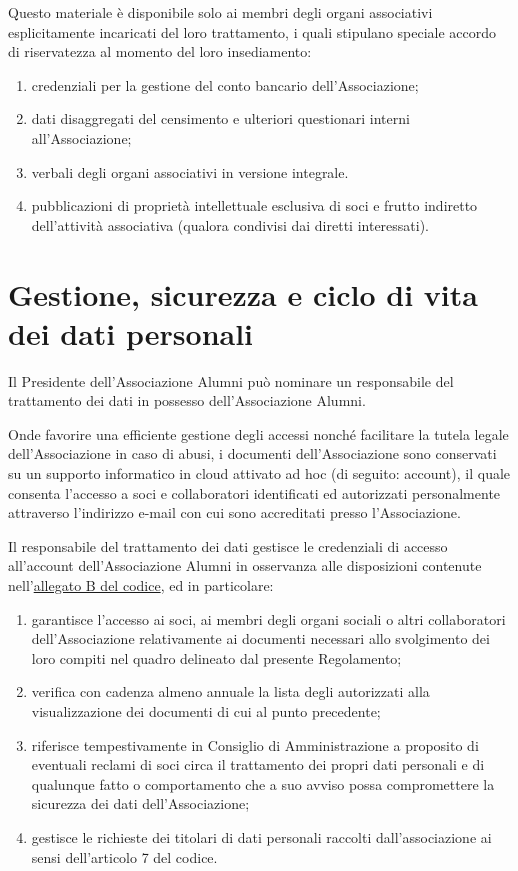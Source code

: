 Questo materiale è disponibile solo ai membri degli organi associativi
esplicitamente incaricati del loro trattamento, i quali stipulano speciale
accordo di riservatezza al momento del loro insediamento:

\begin{enumerate}
    \item credenziali per la gestione del conto bancario dell’Associazione;
    \item dati disaggregati del censimento e ulteriori questionari interni
        all’Associazione;
    \item verbali degli organi associativi in versione integrale.
    \item pubblicazioni di proprietà intellettuale esclusiva di soci e
        frutto indiretto dell’attività associativa (qualora condivisi dai
        diretti interessati).
\end{enumerate}

\section*{Gestione, sicurezza e ciclo di vita dei dati personali}
Il Presidente dell’Associazione Alumni può nominare un responsabile del
trattamento dei dati in possesso dell’Associazione Alumni. 

Onde favorire una efficiente gestione degli accessi nonché facilitare la
tutela legale dell’Associazione in caso di abusi, i documenti
dell’Associazione sono conservati su un supporto informatico in cloud
attivato ad hoc (di seguito: account), il quale consenta l’accesso a soci e
collaboratori identificati ed autorizzati personalmente attraverso
l’indirizzo e-mail con cui sono accreditati presso l’Associazione.

Il responsabile del trattamento dei dati gestisce le credenziali di accesso
all’account dell’Associazione Alumni in osservanza alle disposizioni
contenute nell’\href{http://www.garanteprivacy.it/web/guest/home/docweb/-/docweb-display/docweb/1557184}{allegato B del codice}, ed in particolare: 
\begin{enumerate}
    \item garantisce l’accesso ai soci, ai membri degli organi sociali o
        altri collaboratori dell’Associazione relativamente ai documenti
        necessari allo svolgimento dei loro compiti nel quadro delineato dal
        presente Regolamento;
    \item verifica con cadenza almeno annuale la lista degli autorizzati
        alla visualizzazione dei documenti di cui al punto precedente;
    \item riferisce tempestivamente in Consiglio di Amministrazione a
        proposito di eventuali reclami di soci circa il trattamento dei
        propri dati personali e di qualunque fatto o comportamento che a suo
        avviso possa compromettere la sicurezza dei dati dell’Associazione;
    \item gestisce le richieste dei titolari di dati personali raccolti
        dall’associazione ai sensi dell’articolo 7 del codice.
\end{enumerate}
 
